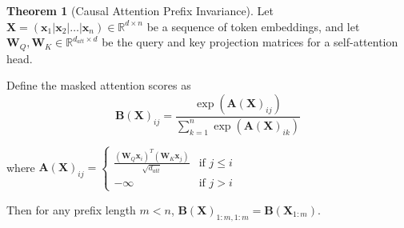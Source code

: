 \documentclass{article} %
\theoremstyle{definition}
\newtheorem{theorem}{Theorem}[section]
\begin{document}
\begin{theorem}[Causal Attention Prefix Invariance]
Let $\mathbf{X} = (\mathbf{x}_1 | \mathbf{x}_2 | \ldots | \mathbf{x}_n) \in \mathbb{R}^{d \times n}$ be a sequence of token embeddings, 
and let $\mathbf{W}_Q, \mathbf{W}_K \in \mathbb{R}^{d_{att} \times d}$ be the query and key projection matrices for a self-attention head.

Define the masked attention scores as 
\begin{equation}
\mathbf{B}(\mathbf{X})_{ij} = \frac{\exp(\mathbf{A}(\mathbf{X})_{ij})}{\sum_{k=1}^{n} \exp(\mathbf{A}(\mathbf{X})_{ik})}
\end{equation}

where $\mathbf{A}(\mathbf{X})_{ij} = 
\begin{cases}
    \frac{(\mathbf{W}_Q \mathbf{x}_i)^T (\mathbf{W}_K \mathbf{x}_j)}{\sqrt{d_{att}}} & \text{if } j \leq i \\
    -\infty & \text{if } j > i
\end{cases}$

Then for any prefix length $m < n$, $\mathbf{B}(\mathbf{X})_{1:m,1:m} = \mathbf{B}(\mathbf{X}_{1:m})$.
\end{theorem}
\end{document}
